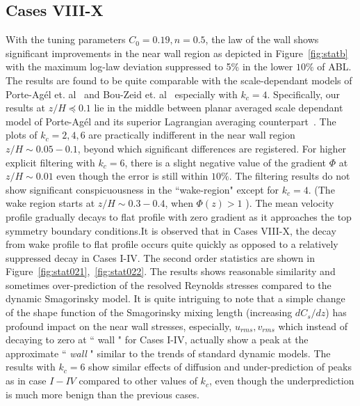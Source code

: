 \subsection{Cases VIII-X}
With the tuning parameters $C_0 = 0.19, n = 0.5$, the law of the wall shows significant improvements in the near wall region as depicted in Figure~\ref{fig:statb} with the maximum log-law deviation suppressed to 5\% in the lower $10\%$ of ABL. The results are found to be quite comparable with the scale-dependant models of Porte-Ag\'{e}l et. al~\cite{porte1fun} and Bou-Zeid et. al~\cite{bou1} especially with $k_c = 4$. Specifically, {our} results at {$z/H\preceq 0.1$} 
{lie in the middle}
between planar averaged scale dependant model of Porte-Ag\'{e}l and its superior Lagrangian averaging counterpart~\cite{bou1}. The plots of $k_c = 2,4,6$ are {practically} indifferent in the near wall region $z/H \sim 0.05-0.1$, beyond which significant differences are registered. For higher explicit filtering with $k_c = 6$, there is a slight negative value of the gradient $\Phi$ at $z/H \sim 0.01$ even though the error is still within $10\%$. The filtering results do not show {significant conspicuousness} in the ``wake-region" except for $k_c = 4$. (The wake region starts at $z/H \sim 0.3-0.4$, when $\Phi(z) > 1$ ). The mean velocity profile gradually decays to {flat profile} with zero gradient as it approaches the top symmetry boundary conditions.{It is observed that in Cases VIII-X, the decay from wake profile to flat profile occurs quite quickly as opposed to a relatively suppressed decay in Cases I-IV.} 
The second order statistics are shown in Figure~\ref{fig:stat021},~\ref{fig:stat022}. The results shows reasonable similarity and sometimes over-prediction of the resolved Reynolds stresses compared to the dynamic Smagorinsky model. {It is quite intriguing to note that a simple change of the shape function of the Smagorinsky mixing length (increasing $dC_s/dz$) has profound impact on the near wall stresses, especially, $u_{rms}, v_{rms}$ which instead of decaying to zero at `` {wall} " for Cases I-IV, actually show a peak at the approximate `` \textit{wall} " similar to the trends of standard dynamic models.}  The results with $k_c=6$ show similar effects of diffusion and {under-prediction of peaks as in case $I-IV$ compared to other values of $k_c$,}  even though the underprediction is much more benign than the previous cases.

